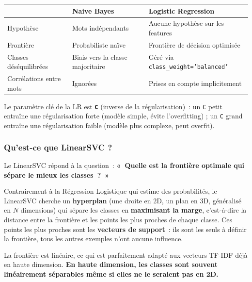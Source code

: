 \documentclass[12pt,a4paper]{report}
\renewcommand{\arraystretch}{1}
\begin{document}
\begin{center}
\renewcommand{\arraystretch}{1.2}
\begin{tabular}{@{}lL{5cm}L{5cm}@{}}
\toprule
 & \textbf{Naive Bayes} & \textbf{Logistic Regression} \\
\midrule
Hypothèse               & Mots indépendants            & Aucune hypothèse sur les features \\
Frontière               & Probabiliste naïve           & Frontière de décision optimisée \\
Classes déséquilibrées  & Biais vers la classe majoritaire & Géré via \texttt{class\_weight='balanced'} \\
Corrélations entre mots & Ignorées                     & Prises en compte implicitement \\
\bottomrule
\end{tabular}
\end{center}

Le paramètre clé de la LR est \textbf{\texttt{C}} (inverse de la régularisation)~: un \texttt{C} petit entraîne une régularisation forte (modèle simple, évite l'overfitting) ; un \texttt{C} grand entraîne une régularisation faible (modèle plus complexe, peut overfit).

\subsubsection*{Qu'est-ce que LinearSVC ?}

Le LinearSVC répond à la question~: \textbf{«~Quelle est la frontière optimale qui sépare le mieux les classes~?~»}

Contrairement à la Régression Logistique qui estime des probabilités, le LinearSVC cherche un \textbf{hyperplan} (une droite en 2D, un plan en 3D, généralisé en $N$ dimensions) qui sépare les classes en \textbf{maximisant la marge}, c'est-à-dire la distance entre la frontière et les points les plus proches de chaque classe. Ces points les plus proches sont les \textbf{vecteurs de support}~: ils sont les seuls à définir la frontière, tous les autres exemples n'ont aucune influence.

La frontière est linéaire, ce qui est parfaitement adapté aux vecteurs TF-IDF déjà en haute dimension. \textbf{En haute dimension, les classes sont souvent linéairement séparables même si elles ne le seraient pas en 2D.}
\end{document}
